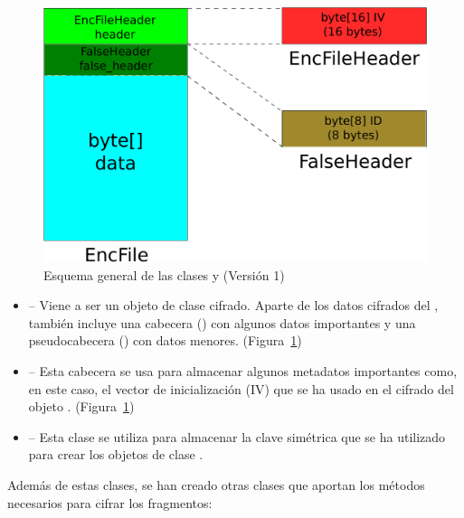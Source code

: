 \begin{figure}[!htb]
  \centering
  \includegraphics[scale=0.4]{Figures/EncFile_Header_1}
  \decoRule
  \caption[ -  (Versión 1)]{Esquema general de las clases  y  (Versión 1)}
  \label{fig:EncFile_Header_1}
\end{figure}

\begin{itemize}
  \item {} -- Viene a ser un objeto de clase  cifrado. Aparte de los datos cifrados del , también incluye una cabecera () con algunos datos importantes y una pseudocabecera () con datos menores. (Figura~\ref{fig:EncFile_Header_1})

  \item {} -- Esta cabecera se usa para almacenar algunos metadatos importantes como, en este caso, el vector de inicialización (IV) que se ha usado en el cifrado del objeto . (Figura~\ref{fig:EncFile_Header_1})

  \item {} -- Esta clase se utiliza para almacenar la clave simétrica que se ha utilizado para crear los objetos de clase .
\end{itemize}

Además de estas clases, se han creado otras clases que aportan los métodos necesarios para cifrar los fragmentos:

